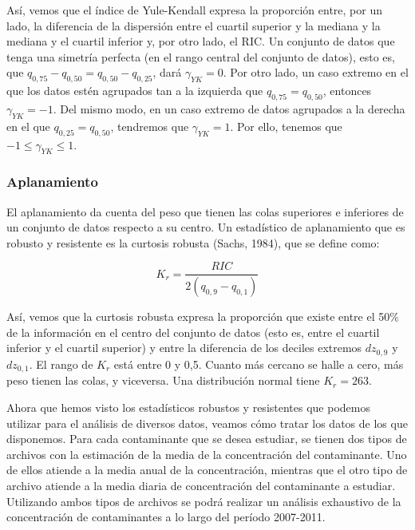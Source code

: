\documentclass[12pt]{article}
\begin{document}
Así, vemos que el índice de Yule-Kendall expresa la proporción entre, por un lado, la diferencia de la dispersión entre el cuartil superior y la mediana y la mediana y el cuartil inferior y, por otro lado, el RIC. Un conjunto de datos que tenga una simetría perfecta (en el rango central del conjunto de datos), esto es, que $q_{0,75} - q_{0,50} = q_{0,50} - q_{0,25}$, dará $\gamma_{YK} = 0$. Por otro lado, un caso extremo en el que los datos estén agrupados tan a la izquierda que $q_{0,75} = q_{0,50}$, entonces $\gamma_{YK} = -1$. Del mismo modo, en un caso extremo de datos agrupados a la derecha en el que $q_{0,25} = q_{0,50}$, tendremos que $\gamma_{YK} = 1$. Por ello, tenemos que $-1 \leq \gamma_{YK} \leq 1$.

\subsubsection{Aplanamiento}

El aplanamiento da cuenta del peso que tienen las colas superiores e inferiores de un conjunto de datos respecto a su centro. Un estadístico de aplanamiento que es robusto y resistente es la curtosis robusta (Sachs, 1984), que se define como:

\begin{equation}
K_{r} = \frac{RIC}{2 (q_{0,9} - q_{0,1})}
\label{eq:robust-kurtosis}
\end{equation}

Así, vemos que la curtosis robusta expresa la proporción que existe entre el 50\% de la información en el centro del conjunto de datos (esto es, entre el cuartil inferior y el cuartil superior) y entre la diferencia de los deciles extremos $dz_{0,9}$ y $dz_{0,1}$. El rango de $K_{r}$ está entre 0 y 0,5. Cuanto más cercano se halle a cero, más peso tienen las colas, y viceversa. Una distribución normal tiene $K_{r} = 263$.

Ahora que hemos visto los estadísticos robustos y resistentes que podemos utilizar para el análisis de diversos datos, veamos cómo tratar los datos de los que disponemos. Para cada contaminante que se desea estudiar, se tienen dos tipos de archivos con la estimación de la media de la concentración del contaminante. Uno de ellos atiende a la media anual de la concentración, mientras que el otro tipo de archivo atiende a la media diaria de concentración del contaminante a estudiar. Utilizando ambos tipos de archivos se podrá realizar un análisis exhaustivo de la concentración de contaminantes a lo largo del período 2007-2011.
\end{document}
